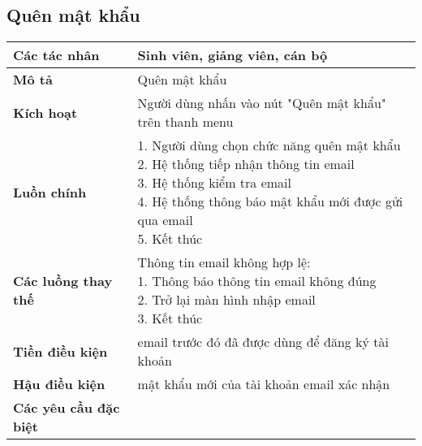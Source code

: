 \subsection{Quên mật khẩu}
\begin{tabular}{|l|p{}|}
	\hline
	\textbf{Các tác nhân}         & Sinh viên, giảng viên, cán bộ                            \\
	\hline
	\textbf{Mô tả}                & Quên mật khẩu                                           \\
	\hline
	\textbf{Kích hoạt}            & Người dùng nhấn vào nút "Quên mật khẩu" trên thanh menu \\
	\hline
	\textbf{Luồn chính}           & \makecell[l]{1. Người dùng chọn chức năng quên mật khẩu \\ 2. Hệ thống tiếp nhận thông tin email \\ 3. Hệ thống kiểm tra email \\ 4. Hệ thống thông báo mật khẩu mới được gửi qua email \\ 5. Kết thúc} \\
	\hline
	\textbf{Các luồng thay thế}   & \makecell[l]{Thông tin email không hợp lệ:              \\ 1. Thông báo thông tin email không đúng \\ 2. Trở lại màn hình nhập email \\ 3. Kết thúc} \\
	\hline
	\textbf{Tiền điều kiện}       & email trước đó đã được dùng để đăng ký tài khoản        \\
	\hline
	\textbf{Hậu điều kiện}        & mật khẩu mới của tài khoản email xác nhận               \\
	\hline
	\textbf{Các yêu cầu đặc biệt} &                                                         \\
	\hline
\end{tabular}

